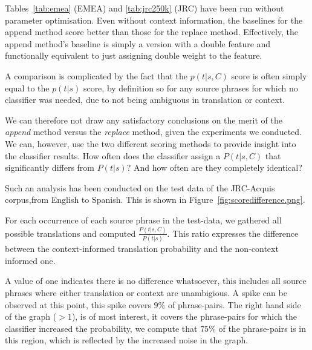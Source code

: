 \documentclass[smallextended]{svjour3}       %
\theoremstyle{break}
\begin{document}
Tables~\ref{tab:emea} (EMEA) and \ref{tab:jrc250k} (JRC) have been run without
parameter optimisation. Even without context information, the baselines for the
append method score better than those for the replace method. Effectively, the
append method's baseline is simply a version with a double feature and
functionally equivalent to just assigning double weight to the feature.

A comparison is complicated by the fact that the $p(t|s,C)$ score is often simply
equal to the $p(t|s)$ score, by definition so for any source phrases for which no
classifier was needed, due to not being ambiguous in translation or context. 

We can therefore not draw any satisfactory conclusions on the merit of the
\emph{append} method versus the \emph{replace} method, given the experiments we
conducted. We can, however, use the two different scoring methods to provide
insight into the classifier results. How often does the classifier assign a
$P(t|s,C)$ that significantly differs from $P(t|s)$? And how often are they
completely identical?

Such an analysis has been conducted on the test data of the JRC-Acquis
corpus,from English to Spanish. This is shown in
Figure~\ref{fig:scoredifference.png}. 

For each occurrence of each source phrase in the test-data, we gathered all
possible translations and computed $\frac{P(t|s,C)}{P(t|s)}$. This ratio
expresses the difference between the context-informed translation probability
and the non-context informed one.

A value of one indicates there is no difference whatsoever, this includes all
source phrases where either translation or context are unambigious. A spike can
be observed at this point, this spike covers $9\%$ of phrase-pairs. The right
hand side of the graph ($>1$), is of most interest, it covers the phrase-pairs
for which the classifier increased the probability, we compute that $75\%$ of
the phrase-pairs is in this region, which is reflected by the increased
noise in the graph. 

\end{document}
